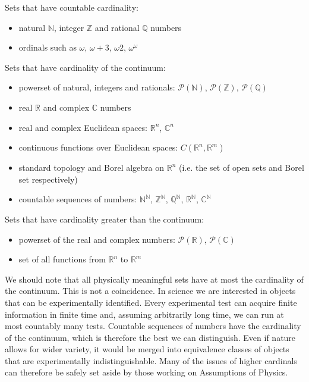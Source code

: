 \documentclass{bareminimum}
\begin{document}
\begin{remark}
	Sets that have countable cardinality:
	\begin{itemize}
		\item natural $\mathbb{N}$, integer $\mathbb{Z}$ and rational $\mathbb{Q}$ numbers 
		\item ordinals such as $\omega$, $\omega + 3$, $\omega2$, $\omega^\omega$
	\end{itemize}
	Sets that have cardinality of the continuum:
	\begin{itemize}
		\item powerset of natural, integers and rationals: $\mathcal{P}(\mathbb{N})$, $\mathcal{P}(\mathbb{Z})$, $\mathcal{P}(\mathbb{Q})$
		\item real $\mathbb{R}$ and complex $\mathbb{C}$ numbers
		\item real and complex Euclidean spaces: $\mathbb{R}^n$, $\mathbb{C}^n$
		\item continuous functions over Euclidean spaces: $C(\mathbb{R}^n, \mathbb{R}^m)$
		\item standard topology and Borel algebra on $\mathbb{R}^n$ (i.e. the set of open sets and Borel set respectively)
		\item countable sequences of numbers: $\mathbb{N}^\mathbb{N}$, $\mathbb{Z}^\mathbb{N}$, $\mathbb{Q}^\mathbb{N}$, $\mathbb{R}^\mathbb{N}$, $\mathbb{C}^\mathbb{N}$
	\end{itemize}
	Sets that have cardinality greater than the continuum:
	\begin{itemize}
		\item powerset of the real and complex numbers: $\mathcal{P}(\mathbb{R})$, $\mathcal{P}(\mathbb{C})$
		\item set of all functions from $\mathbb{R}^n$ to $\mathbb{R}^m$
	\end{itemize}

	We should note that all physically meaningful sets have at most the cardinality of the continuum. This is not a coincidence. In science we are interested in objects that can be experimentally identified. Every experimental test can acquire finite information in finite time and, assuming arbitrarily long time, we can run at most countably many tests. Countable sequences of numbers have the cardinality of the continuum, which is therefore the best we can distinguish. Even if nature allows for wider variety, it would be merged into equivalence classes of objects that are experimentally indistinguishable. Many of the issues of higher cardinals can therefore be safely set aside by those working on Assumptions of Physics.
\end{remark}
\end{document}
